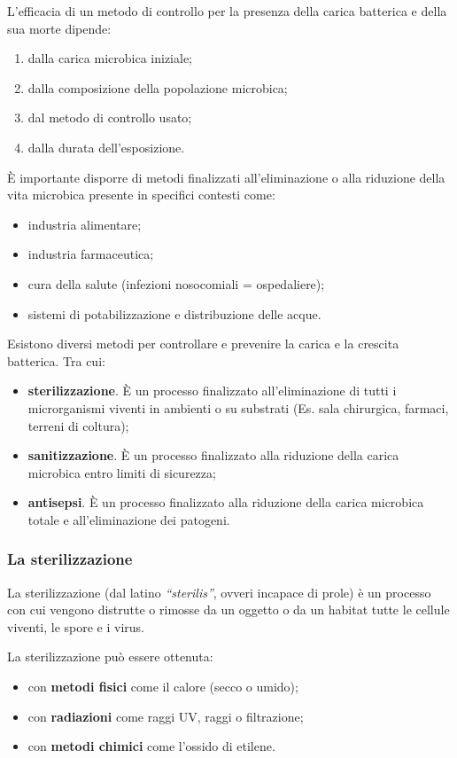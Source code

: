 \documentclass[11pt]{book}
\begin{document}
L’efficacia di un metodo di controllo per la presenza della carica batterica e della sua morte dipende:
\begin{enumerate}
\item dalla carica microbica iniziale;
\item dalla composizione della popolazione microbica;
\item dal metodo di controllo usato;
\item dalla durata dell’esposizione.
\end{enumerate}

\`E importante disporre di metodi finalizzati all’eliminazione o alla riduzione della vita microbica presente in specifici contesti come:
\begin{itemize}
\item industria alimentare;
\item industria farmaceutica;
\item cura della salute (infezioni nosocomiali = ospedaliere);
\item sistemi di potabilizzazione e distribuzione delle acque.
\end{itemize}

Esistono diversi metodi per controllare e prevenire la carica e la crescita batterica. Tra cui:
\begin{itemize}
\item \textbf{sterilizzazione}. \`E un processo finalizzato all’eliminazione di tutti i microrganismi viventi in ambienti o su substrati (Es. sala chirurgica, farmaci, terreni di coltura);
\item \textbf{sanitizzazione}. \`E un processo finalizzato alla riduzione della carica microbica entro limiti di sicurezza;
\item \textbf{antisepsi}. \`E un processo finalizzato alla riduzione della carica microbica totale e all’eliminazione dei patogeni.
\end{itemize}


\subsubsection{La sterilizzazione}
La sterilizzazione (dal latino \emph{``sterilis''}, ovveri incapace di prole) è un processo con cui vengono distrutte o rimosse da un oggetto o da un habitat tutte le cellule viventi, le spore e i virus.

La sterilizzazione può essere ottenuta: 
\begin{itemize}
\item con \textbf{metodi fisici} come il calore (secco o umido); 
\item con \textbf{radiazioni} come raggi UV, raggi o filtrazione;
\item con \textbf{metodi chimici} come l'ossido di etilene.
\end{itemize}
\end{document}
